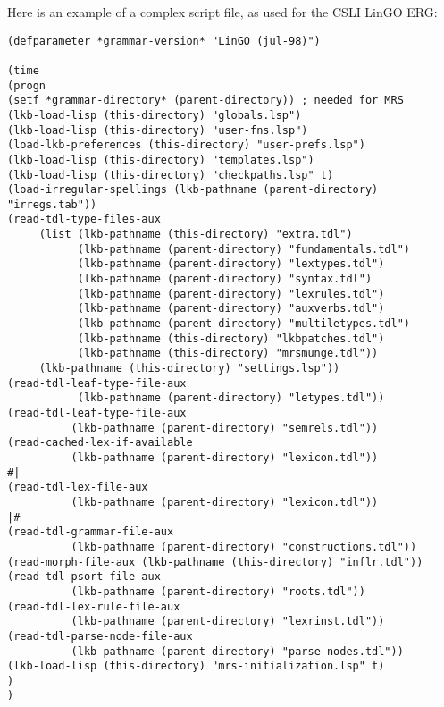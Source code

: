 \documentclass[12pt]{report}
\begin{document}
Here is an example of a complex script file, as used for
the CSLI LinGO ERG:
\begin{verbatim}
(defparameter *grammar-version* "LinGO (jul-98)")

(time
(progn
(setf *grammar-directory* (parent-directory)) ; needed for MRS
(lkb-load-lisp (this-directory) "globals.lsp")
(lkb-load-lisp (this-directory) "user-fns.lsp")
(load-lkb-preferences (this-directory) "user-prefs.lsp")
(lkb-load-lisp (this-directory) "templates.lsp")
(lkb-load-lisp (this-directory) "checkpaths.lsp" t)
(load-irregular-spellings (lkb-pathname (parent-directory) "irregs.tab"))
(read-tdl-type-files-aux
     (list (lkb-pathname (this-directory) "extra.tdl")
           (lkb-pathname (parent-directory) "fundamentals.tdl")
           (lkb-pathname (parent-directory) "lextypes.tdl")
           (lkb-pathname (parent-directory) "syntax.tdl")
           (lkb-pathname (parent-directory) "lexrules.tdl")
           (lkb-pathname (parent-directory) "auxverbs.tdl")
           (lkb-pathname (parent-directory) "multiletypes.tdl")
           (lkb-pathname (this-directory) "lkbpatches.tdl")
           (lkb-pathname (this-directory) "mrsmunge.tdl"))
     (lkb-pathname (this-directory) "settings.lsp"))
(read-tdl-leaf-type-file-aux
           (lkb-pathname (parent-directory) "letypes.tdl"))
(read-tdl-leaf-type-file-aux
          (lkb-pathname (parent-directory) "semrels.tdl"))
(read-cached-lex-if-available 
          (lkb-pathname (parent-directory) "lexicon.tdl"))
#|
(read-tdl-lex-file-aux 
          (lkb-pathname (parent-directory) "lexicon.tdl"))
|#
(read-tdl-grammar-file-aux 
          (lkb-pathname (parent-directory) "constructions.tdl"))
(read-morph-file-aux (lkb-pathname (this-directory) "inflr.tdl"))
(read-tdl-psort-file-aux 
          (lkb-pathname (parent-directory) "roots.tdl"))
(read-tdl-lex-rule-file-aux 
          (lkb-pathname (parent-directory) "lexrinst.tdl"))
(read-tdl-parse-node-file-aux 
          (lkb-pathname (parent-directory) "parse-nodes.tdl"))
(lkb-load-lisp (this-directory) "mrs-initialization.lsp" t)
)
)
\end{verbatim}
\end{document}
